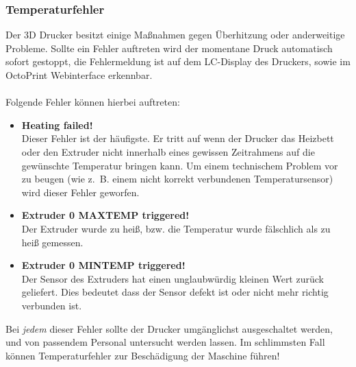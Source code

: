\subsubsection{Temperaturfehler}

Der 3D Drucker besitzt einige Maßnahmen gegen Überhitzung oder anderweitige Probleme. Sollte ein Fehler auftreten wird der momentane Druck automatisch sofort gestoppt, die Fehlermeldung ist auf dem LC-Display des Druckers, sowie im OctoPrint Webinterface erkennbar.\\ \\
Folgende Fehler können hierbei auftreten:

\begin{itemize}
\item \textbf{Heating failed!} \\
		Dieser Fehler ist der häufigste. Er tritt auf wenn der Drucker das Heizbett oder den Extruder nicht innerhalb eines gewissen Zeitrahmens auf die gewünschte Temperatur bringen kann. Um einem technischem Problem vor zu beugen (wie z.~B. einem nicht korrekt verbundenen Temperatursensor) wird dieser Fehler geworfen.
\item \textbf{Extruder 0 MAXTEMP triggered!} \\ 
		Der Extruder wurde zu heiß, bzw. die Temperatur wurde fälschlich als zu heiß gemessen.
\item \textbf{Extruder 0 MINTEMP triggered!} \\
		Der Sensor des Extruders hat einen unglaubwürdig kleinen Wert zurück geliefert. Dies bedeutet dass der Sensor defekt ist oder nicht mehr richtig verbunden ist.
\end{itemize}

Bei \emph{jedem} dieser Fehler sollte der Drucker umgänglichst ausgeschaltet werden, und von passendem Personal untersucht werden lassen.
Im schlimmsten Fall können Temperaturfehler zur Beschädigung der Maschine führen!